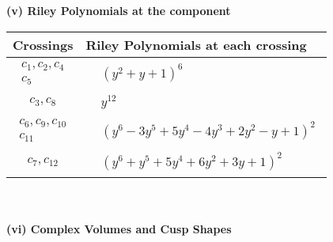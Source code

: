 \documentclass[1p]{elsarticle_modified}
\theoremstyle{definition}
\begin{document}
\newpage\renewcommand{\arraystretch}{1}
\flushleft \textbf{(v) Riley Polynomials at the component}\newline \\
\begin{tabular}{m{50pt}|m{274pt}}
Crossings & \hspace{64pt}Riley Polynomials at each crossing \\
\hline $$\begin{aligned}c_{1},c_{2},c_{4}\\c_{5}\end{aligned}$$&$\begin{aligned}
&(y^2+y+1)^6
\end{aligned}$\\
\hline $$\begin{aligned}c_{3},c_{8}\end{aligned}$$&$\begin{aligned}
&y^{12}
\end{aligned}$\\
\hline $$\begin{aligned}c_{6},c_{9},c_{10}\\c_{11}\end{aligned}$$&$\begin{aligned}
&(y^6-3 y^5+5 y^4-4 y^3+2 y^2- y+1)^2
\end{aligned}$\\
\hline $$\begin{aligned}c_{7},c_{12}\end{aligned}$$&$\begin{aligned}
&(y^6+y^5+5 y^4+6 y^2+3 y+1)^2
\end{aligned}$\\
\hline
\end{tabular}\\~\\
\newpage\flushleft \textbf{(vi) Complex Volumes and Cusp Shapes}
\end{document}
